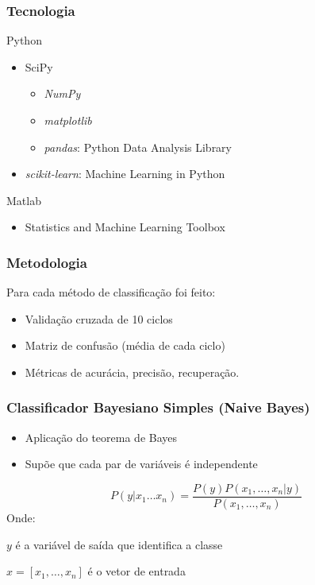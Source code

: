 \documentclass{beamer}
\begin{document}
\begin{frame}
\frametitle{Tecnologia}
\begin{block}{Python}
\begin{itemize}
\item SciPy
	\begin{itemize}
	\item \textit{NumPy}
	\item \textit{matplotlib}
	\item \textit{pandas}: Python Data Analysis Library
	\end{itemize}
\item \textit{scikit-learn}: Machine Learning in Python
\end{itemize}
\end{block}

\begin{block}{Matlab}
\begin{itemize}
\item Statistics and Machine Learning Toolbox
\end{itemize}
\end{block}

\end{frame}


\begin{frame}
\frametitle{Metodologia}
Para cada método de classificação foi feito:
\begin{itemize}
\item Validação cruzada de 10 ciclos
\item Matriz de confusão (média de cada ciclo)
\item Métricas de acurácia, precisão, recuperação. 
\end{itemize}
\end{frame}


\begin{frame}
\frametitle{Classificador Bayesiano Simples (Naive Bayes)}
\begin{itemize} 
\item Aplicação do teorema de Bayes
\item Supõe que cada par de variáveis é independente
\end{itemize}

\begin{theorem}
\[P(y|x_1 \dots x_n)  = \frac{P(y)P(x_1, \dots, x_n|y)}{P(x_1,\dots, x_n)}\]
Onde:

$y$ é a variável de saída que identifica a classe

$x = [x_1, \dots, x_n] $ é o vetor de entrada 

\end{theorem}

\end{frame}
\end{document}
